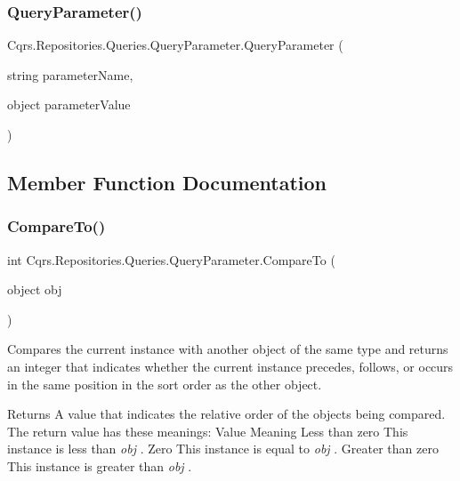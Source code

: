 \subsubsection{\texorpdfstring{Query\+Parameter()}{QueryParameter()}\hspace{0.1cm}{\footnotesize\ttfamily [2/2]}}
{\footnotesize\ttfamily Cqrs.\+Repositories.\+Queries.\+Query\+Parameter.\+Query\+Parameter (\begin{DoxyParamCaption}\item[{string}]{parameter\+Name,  }\item[{object}]{parameter\+Value }\end{DoxyParamCaption})}



\subsection{Member Function Documentation}
\mbox{\label{classCqrs_1_1Repositories_1_1Queries_1_1QueryParameter_a59a2bda12bc0161d0ceb95eb02062d08_a59a2bda12bc0161d0ceb95eb02062d08}} 
\subsubsection{\texorpdfstring{Compare\+To()}{CompareTo()}\hspace{0.1cm}{\footnotesize\ttfamily [1/2]}}
{\footnotesize\ttfamily int Cqrs.\+Repositories.\+Queries.\+Query\+Parameter.\+Compare\+To (\begin{DoxyParamCaption}\item[{object}]{obj }\end{DoxyParamCaption})}



Compares the current instance with another object of the same type and returns an integer that indicates whether the current instance precedes, follows, or occurs in the same position in the sort order as the other object. 

\begin{DoxyReturn}{Returns}
A value that indicates the relative order of the objects being compared. The return value has these meanings\+: Value Meaning Less than zero This instance is less than {\itshape obj} . Zero This instance is equal to {\itshape obj} . Greater than zero This instance is greater than {\itshape obj} . 
\end{DoxyReturn}

